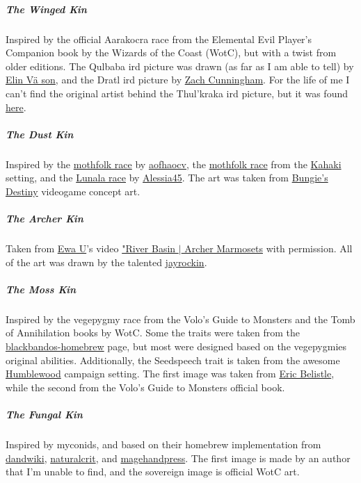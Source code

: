     \subparagraph{The Winged Kin} Inspired by the official Aarakocra race from the Elemental Evil Player's Companion book by the Wizards of the Coast (WotC), but with a twist from older editions.
    The Qulbaba ird picture was drawn (as far as I am able to tell) by \href{https://www.artstation.com/elinvason}{Elin V\"a son}, and the Dratl ird picture by \href{https://zachcunninghamart.weebly.com/}{Zach Cunningham}.
    For the life of me I can't find the original artist behind the Thul'kraka ird picture, but it was found \href{https://www.pinterest.com.au/pin/772859986026889236/?nic_v1=1aMPfjrcEzGBNwm803q3V1cypforv8WVbZ4jUXYP9aDqcJFyrfUt0Ww9rAOEq3SPSw}{here}.

    \subparagraph{The Dust Kin} Inspired by the \href{https://drive.google.com/file/d/1M200-YKAbl-nOLo52W--gkXVO6QpmihE/view}{mothfolk race} by \href{https://twitter.com/aofhaocv}{aofhaocv}, the \href{http://volthorne.wikidot.com/kahakai:races}{mothfolk race} from the \href{http://volthorne.wikidot.com/kahakai}{Kahaki} setting, and the \href{https://drive.google.com/file/d/1hxPW6VRRlcWuK9ukljLCO3ORSNlonwm1/view}{Lunala race} by \href{https://www.reddit.com/user/Alessia45/}{Alessia45}.
    The art was taken from \href{https://www.bungie.net/}{Bungie's Destiny} videogame concept art.

    \subparagraph{The Archer Kin} Taken from \href{https://www.youtube.com/channel/UCncTjqw75krp9j_wRRh5Gvw}{Ewa U}'s video \href{https://www.youtube.com/watch?v=_XCqpZwm39Q}{"River Basin $\mid$ Archer Marmosets} with permission.
    All of the art was drawn by the talented \href{https://jayrockin.tumblr.com/}{jayrockin}.

    \subparagraph{The Moss Kin} Inspired by the vegepygmy race from the Volo's Guide to Monsters and the Tomb of Annihilation books by WotC.
    Some the traits were taken from the \href{https://blackbandos-homebrew.fandom.com/wiki/Vegepygmy_(5e_Race)}{blackbandos-homebrew} page, but most were designed based on the vegepygmies original abilities.
    Additionally, the Seedspeech trait is taken from the awesome \href{https://thedeckofmany.com/collections/humblewood}{Humblewood} campaign setting.
    The first image was taken from \href{http://ericbelisle.com/}{Eric Belistle}, while the second from the Volo's Guide to Monsters official book.

    \subparagraph{The Fungal Kin} Inspired by myconids, and based on their homebrew implementation from \href{https://www.dandwiki.com/wiki/Myconid_(5e_Race)}{dandwiki}, \href{https://www.reddit.com/r/UnearthedArcana/comments/5269hx/race_myconid/}{naturalcrit}, and \href{https://mfov.magehandpress.com/2015/09/myconids.html}{magehandpress}.
    The first image is made by an author that I'm unable to find, and the sovereign image is official WotC art.

